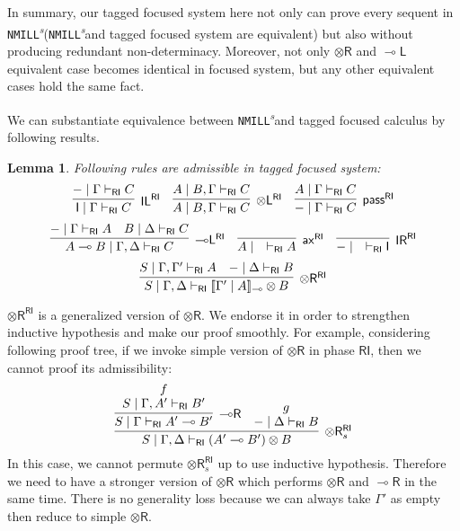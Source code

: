 \documentclass[submission,copyright,creativecommons]{eptcs}
\newtheorem{lemma}[theorem]{Lemma}
\theoremstyle{definition}
\newcommand{\ldbc}{[\![}
\newcommand{\rdbc}{]\!]}
\newcommand{\tl}{\otimes \mathsf{L}}
\newcommand{\tr}{\otimes \mathsf{R}}
\newcommand{\lright}{{\multimap}\mathsf{R}}
\newcommand{\lleft}{{\multimap}\mathsf{L}}
\newcommand{\pass}{\mathsf{pass}}
\newcommand{\unitl}{\mathsf{IL}}
\newcommand{\unitr}{\mathsf{IR}}
\newcommand{\ax}{\mathsf{ax}}
\newcommand{\ot}{\otimes}
\newcommand{\lolli}{\multimap}
\newcommand{\I}{\mathsf{I}}
\newcommand{\RI}{\mathsf{RI}}
\newcommand{\NMILL}{\texttt{NMILL}}
\newcommand{\SkNMILL}{\NMILL\textsuperscript{\textit{s}}}
\begin{document}
In summary, our tagged focused system here not only can prove every sequent in \SkNMILL (\SkNMILL and tagged focused system are equivalent) but also without producing redundant non-determinacy.
Moreover, not only $\tr$ and $\lleft$ equivalent case becomes identical in focused system, but any other equivalent cases hold the same fact.

We can substantiate equivalence between \SkNMILL and tagged focused calculus by following results.
\begin{lemma}\label{AdmissibleInRI}
  Following rules are admissible in tagged focused system:
  \begin{displaymath}
    \infer[\unitl^{\RI}]{\I \mid \Gamma \vdash_{\RI} C}{- \mid \Gamma \vdash_{\RI} C}
    \quad
    \infer[\tl^{\RI}]{A \mid B, \Gamma \vdash_{\RI} C}{A \mid B, \Gamma \vdash_{\RI} C}
    \quad
    \infer[\pass^{\RI}]{- \mid \Gamma \vdash_{\RI} C}{A \mid \Gamma \vdash_{\RI} C}
  \end{displaymath}
  \begin{displaymath}
    \infer[\lleft^{\RI}]{A \lolli B \mid \Gamma , \Delta \vdash_{\RI} C}{
    - \mid \Gamma \vdash_{\RI} A
    &
    B \mid \Delta \vdash_{\RI} C
    }
    \quad
    \infer[\ax^{\RI}]{A \mid \quad \vdash_{\RI} A}{}
    \quad
    \infer[\unitr^{\RI}]{- \mid \quad \vdash_{\RI} \I}{}
  \end{displaymath}
  \begin{displaymath}
    \infer[\tr^{\RI}]{S \mid \Gamma , \Delta \vdash_{\RI} \ldbc \Gamma' \mid A \rdbc_{\lolli} \ot B}{
      S \mid \Gamma , \Gamma' \vdash_{\RI} A
      &
      - \mid \Delta \vdash_{\RI} B
    }
  \end{displaymath}
\end{lemma}

$\tr^{\RI}$ is a generalized version of $\tr$.
We endorse it in order to strengthen inductive hypothesis and make our proof smoothly.
For example, considering following proof tree, if we invoke simple version of $\tr$ in phase $\RI$, then we cannot proof its admissibility:
\begin{displaymath}
  \infer[\tr^{\RI}_s]{S \mid \Gamma , \Delta \vdash_{\RI} (A' \lolli B') \ot B}{
    \infer[\lright]{S \mid \Gamma \vdash_{\RI} A' \lolli B'}{
      \deduce{S \mid \Gamma , A' \vdash_{\RI} B'}{f}
    }
    &
    \deduce{- \mid \Delta \vdash_{\RI} B}{g}
  }
\end{displaymath}
In this case, we cannot permute $\tr^{\RI}_s$ up to use inductive hypothesis.
Therefore we need to have a stronger version of $\tr$ which performs $\tr$ and $\lright$ in the same time.
There is no generality loss because we can always take $\Gamma'$ as empty then reduce to simple $\tr$.
\end{document}
